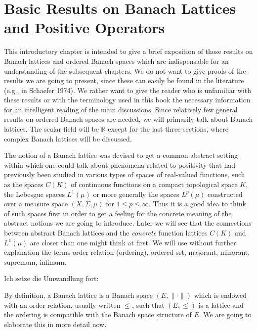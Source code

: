 
\chapter{Basic Results on Banach Lattices and Positive Operators}\label{chap:c1}

This introductory chapter is intended to give a brief exposition of those results on Banach lattices and ordered Banach spaces which are indispensable for an understanding of the subsequent chapters.
We do not want to give proofs of the results we are going to present, since these can easily be found in the literature (e.g., in Schaefer 1974).
We rather want to give the reader who is unfamiliar with these results or with the terminology used in this book the necessary information for an intelligent reading of the main discussions.
Since relatively few general results on ordered Banach spaces are needed, we will primarily talk about Banach lattices.
The scalar field will be $ \mathbb{R} $ except for the last three sections, where complex Banach lattices will be discussed.

The notion of a Banach lattice was devised to get a common abstract setting within which one could talk about phenomena related to positivity that had previously been studied in various types of spaces of real-valued functions, such as the spaces $ C(K) $ of continuous functions on a compact topological space $ K $, the Lebesgue spaces $ L^{1}(\mu) $ or more generally the spaces $ L^{p}(\mu) $ constructed over a measure space $ (X,\Sigma,\mu) $ for $ 1 \leq p \leq \infty $.
Thus it is a good idea to think of such spaces first in order to get a feeling for the concrete meaning of the abstract notions we are going to introduce.
Later we will see that the connections between abstract Banach lattices and the \emph{concrete} function lattices $ C(K) $ and $ L^{1}(\mu) $ are closer than one might think at first.
We will use without further explanation the terms order relation (ordering), ordered set, majorant, minorant, supremum, infimum.

\pagebreak

Ich setze die Umwandlung fort:

By definition, a Banach lattice is a Banach space $ (E,\|\cdot\|) $ which is endowed with an order relation, usually written $ \leq $, such that $ (E,\leq) $ is a lattice and the ordering is compatible with the Banach space structure of $ E $.
We are going to elaborate this in more detail now.

